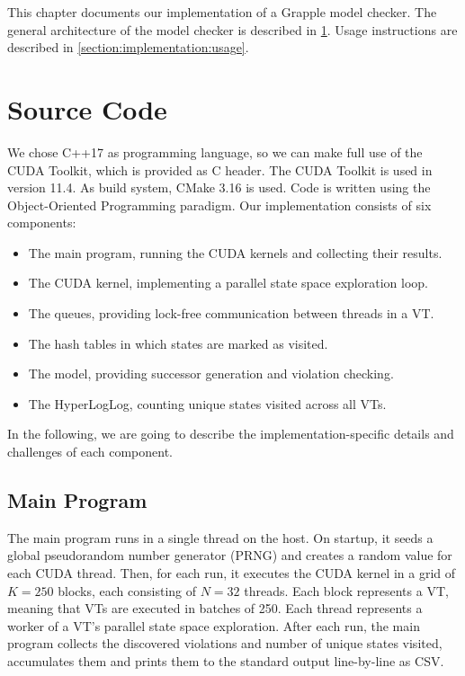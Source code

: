 \documentclass[
fancyheadings, %
%
%
]{stsreprt}
\begin{document}
This chapter documents our implementation of a Grapple model checker.
The general architecture of the model checker is described in \cref{section:implementation:source-code}.
Usage instructions are described in \cref{section:implementation:usage}.

\section{Source Code}
\label{section:implementation:source-code}

We chose C++17 as programming language, so we can make full use of the CUDA Toolkit, which is provided as C header.
The CUDA Toolkit is used in version 11.4.
As build system, CMake 3.16 is used.
Code is written using the Object-Oriented Programming paradigm.
Our implementation consists of six components:

\begin{itemize}
    \item The main program, running the CUDA kernels and collecting their results.
    \item The CUDA kernel, implementing a parallel state space exploration loop.
    \item The queues, providing lock-free communication between threads in a VT.
    \item The hash tables in which states are marked as visited.
    \item The model, providing successor generation and violation checking.
    \item The HyperLogLog, counting unique states visited across all VTs.
\end{itemize}


In the following, we are going to describe the implementation-specific details and challenges of each component.

\subsection{Main Program}

The main program runs in a single thread on the host.
On startup, it seeds a global pseudorandom number generator (PRNG) and creates a random value for each CUDA thread.
Then, for each run, it executes the CUDA kernel in a grid of $K=250$ blocks, each consisting of $N=32$ threads.
Each block represents a VT, meaning that VTs are executed in batches of 250.
Each thread represents a worker of a VT's parallel state space exploration.
After each run, the main program collects the discovered violations and number of unique states visited, accumulates them and prints them to the standard output line-by-line as CSV.
\end{document}
